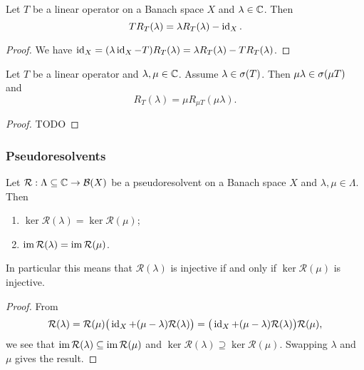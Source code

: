 \begin{lemma}
Let $T$ be a linear operator on a Banach space $X$ and $\lambda\in\mathbb{C}$. Then
\[ TR_T(\lambda) = \lambda R_T(\lambda) - \operatorname{id}_X. \]
\end{lemma}
\begin{proof}
We have $\operatorname{id}_X = (\lambda \operatorname{id}_X - T)R_T(\lambda) = \lambda R_T(\lambda) - TR_T(\lambda)$.
\end{proof}

\begin{lemma}
Let $T$ be a linear operator and $\lambda,\mu\in\mathbb{C}$. Assume $\lambda\in \sigma(T)$. Then $\mu\lambda\in \sigma(\mu T)$ and
\[ R_T(\lambda) = \mu R_{\mu T}(\mu \lambda). \]
\end{lemma}
\begin{proof}
TODO
\end{proof}


\subsubsection{Pseudoresolvents}

\begin{lemma} \label{imageRangePseudoresolvents}
Let $\mathcal{R}:\Lambda \subseteq \mathbb{C} \to \operatorname{\mathcal{B}}(X)$ be a pseudoresolvent on a Banach space $X$ and $\lambda,\mu\in\Lambda$. Then
\begin{enumerate}
\item $\ker\mathcal{R}(\lambda) = \ker\mathcal{R}(\mu)$;
\item $\operatorname{im}\mathcal{R}(\lambda) = \operatorname{im}\mathcal{R}(\mu)$.
\end{enumerate}
In particular this means that $\mathcal{R}(\lambda)$ is injective \textup{if and only if} $\ker\mathcal{R}(\mu)$ is injective.
\end{lemma}
\begin{proof}
From
\[ \mathcal{R}(\lambda) = \mathcal{R}(\mu)\big(\operatorname{id}_X + (\mu-\lambda)\mathcal{R}(\lambda)\big) = \big(\operatorname{id}_X + (\mu-\lambda)\mathcal{R}(\lambda)\big)\mathcal{R}(\mu), \]
we see that $\operatorname{im}\mathcal{R}(\lambda) \subseteq \operatorname{im}\mathcal{R}(\mu)$ and $\ker\mathcal{R}(\lambda) \supseteq \ker\mathcal{R}(\mu)$. Swapping $\lambda$ and $\mu$ gives the result.
\end{proof}


